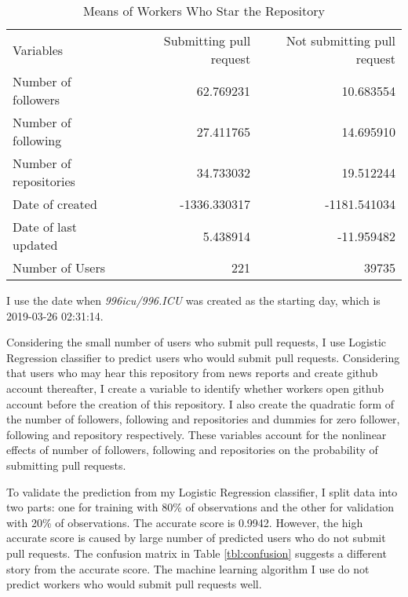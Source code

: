 \begin{table}[htbp]
    \caption{Means of Workers Who Star the Repository}\label{tbl:mean}
    \centering
    \begin{threeparttable}
    \begin{tabular}{lrr} \toprule
    Variables               &  Submitting pull request & Not submitting pull request \\
    Number of followers     &  62.769231               &  10.683554 \\
    Number of following     & 27.411765    & 14.695910 \\
    Number of repositories  &  34.733032   & 19.512244 \\
    Date of created         & -1336.330317 & -1181.541034 \\
    Date of last updated    &   5.438914   & -11.959482 \\ \midrule
    Number of Users         &  221         & 39735 \\ \bottomrule
    \end{tabular}
    \begin{tablenotes} \footnotesize
        \item I use the date when \textit{996icu/996.ICU} was created as the starting day, which is 2019-03-26 02:31:14.
    \end{tablenotes}
    \end{threeparttable}
\end{table}

Considering the small number of users who submit pull requests, I use Logistic Regression classifier to predict users who would submit pull requests. Considering that users who may hear this repository from news reports and create github account thereafter, I create a variable to identify whether workers open github account before the creation of this repository. I also create the quadratic form of the number of followers, following and repositories and dummies for zero follower, following and repository respectively. These variables account for the nonlinear effects of number of followers, following and repositories on the probability of submitting pull requests.

To validate the prediction from my Logistic Regression classifier, I split data into two parts: one for training with 80\% of observations and the other for validation with 20\% of observations. The accurate score is 0.9942. However, the high accurate score is caused by large number of predicted users who do not submit pull requests. The confusion matrix in Table \ref{tbl:confusion} suggests a different story from the accurate score. The machine learning algorithm I use do not predict workers who would submit pull requests well.

